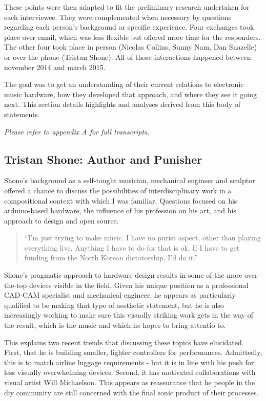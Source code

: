 These points were then adapted to fit the preliminary research undertaken for each interviewee. They were complemented when necessary by questions regarding each person's background or specific experience. Four exchanges took place over email, which was less flexible but offered more time for the responders. The other four took place in person (Nicolas Collins, Sunny Nam, Dan Snazelle) or over the phone (Tristan Shone). All of those interactions happened between november 2014 and march 2015. 

The goal was to get an understanding of their current relations to electronic music hardware, how they developed that approach, and where they see it going next. This section details highlights and analyses derived from this body of statements. 

\emph{Please refer to appendix A for full transcripts.}

\subsection{Tristan Shone: Author and Punisher}

Shone's background as a self-taught musician, mechanical engineer and sculptor offered a chance to discuss the possibilities of interdisciplinary work in a compositional context with which I was familiar. Questions focused on his arduino-based hardware, the influence of his profession on his art, and his  approach to design and open source. 

\begin{quote}
	
	``I'm just trying to make music. I have no purist aspect, other than playing everything live. Anything I have to do for that is ok. If I have to get funding from the North Korean dictatorship, I'd do it.''
	
	\end{quote}
	
Shone's pragmatic approach to hardware design results in some of the more over-the-top devices visible in the field. Given his unique position as a professional CAD-CAM specialist and mechanical engineer, he appears as particularly qualified to be making that type of aesthetic statement, but he is also increasingly working to make sure this visually striking work gets in the way of the result, which is the music and which he hopes to bring attentio to. 

This explains two recent trends that discussing these topics have elucidated. First, that he is building smaller, lighter controllers for performances. Admittedly, this is to match airline luggage requirements - but it is in line with his push for less visually overwhelming devices. Second, it has motivated collaborations with visual artist Will Michaelson. This appears as reassurance that he people in the diy community are still concerned with the final sonic product of their processes. 

